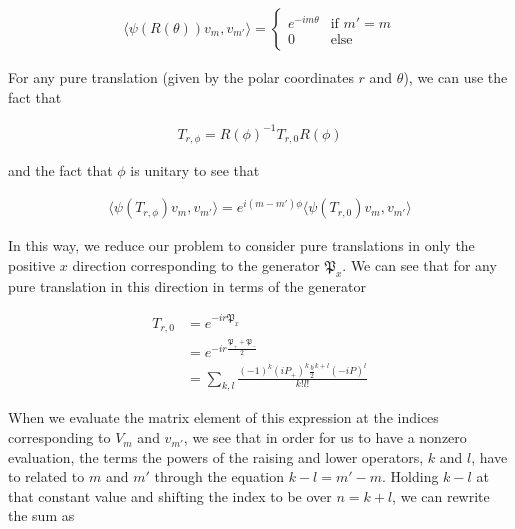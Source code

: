 \documentclass[10pt]{ucthesis}
\begin{document}
\begin{equation}
\begin{aligned}
 \langle \psi(R(\theta))v_m , v_{m'} \rangle = \begin{cases}
																e^{-im\theta} & \text{if }m' = m\\
																0 & \text{else}
															\end{cases}
\end{aligned}
\end{equation}

For any pure translation (given by the polar coordinates $r$ and $\theta$), we can use the fact that

\begin{equation}
\begin{aligned}
	T_{r,\phi} = R(\phi)^{-1}T_{r,0}R(\phi)
\end{aligned}
\end{equation}

and the fact that $\phi$ is unitary to see that 

\begin{equation}
\begin{aligned}
 \langle \psi(T_{r,\phi})v_m , v_{m'} \rangle = e^{i(m-m')\phi}\langle \psi(T_{r,0})v_m , v_{m'} \rangle
\end{aligned}
\end{equation}

In this way, we reduce our problem to consider pure translations in only the positive $x$ direction corresponding to the generator $\mathfrak{P}_x$. We can see that for any pure translation in this direction in terms of the generator

\begin{equation}
\begin{aligned}
	 T_{r,0} &= e^{-ir\mathfrak{P}_x}\\
			&= e^{-ir\frac{\mathfrak{P}_++\mathfrak{P}_-}{2}} \\
			&= \sum_{k,l} \frac{(-1)^k(iP_+)^k\frac{b}{2}^{k+l}(-iP)^l}{k!l!}
\end{aligned}
\end{equation}

When we evaluate the matrix element of this expression at the indices corresponding to $V_m$ and $v_{m'}$, we see that in order for us to have a nonzero evaluation, the terms the powers of the raising and lower operators, $k$ and $l$, have to related to $m$ and $m'$ through the equation $k-l=m'-m$. Holding $k-l$ at that constant value and shifting the index to be over $n=k+l$, we can rewrite the sum as
\end{document}
